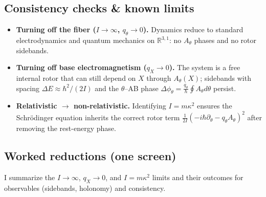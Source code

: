 \subsection{Consistency checks \& known limits}\label{sec:consistency-checks}
\begin{itemize}
  \item \textbf{Turning off the fiber ($I\to\infty$, $q_\theta\to 0$).} Dynamics reduce to standard electrodynamics and quantum mechanics on $\mathbb R^{3,1}$: no $A_\theta$ phases and no rotor sidebands.
  \item \textbf{Turning off base electromagnetism ($q_X\to 0$).} The system is a free internal rotor that can still depend on $X$ through $A_\theta(X)$; sidebands with spacing $\Delta E\approx \hbar^2/(2I)$ and the $\theta$--AB phase $\Delta\phi_\theta=\tfrac{q_\theta}{\hbar}\oint A_\theta d\theta$ persist.
  \item \textbf{Relativistic $\to$ non-relativistic.} Identifying $I=m\kappa^2$ ensures the Schr\"odinger equation inherits the correct rotor term $\tfrac{1}{2I}(-i\hbar\partial_\theta-q_\theta A_\theta)^2$ after removing the rest-energy phase.
\end{itemize}

\subsection{Worked reductions (one screen)}\label{sec:worked-reductions}
I summarize the $I\to\infty$, $q_X\to 0$, and $I=m\kappa^2$ limits and their outcomes for observables (sidebands, holonomy) and consistency.

